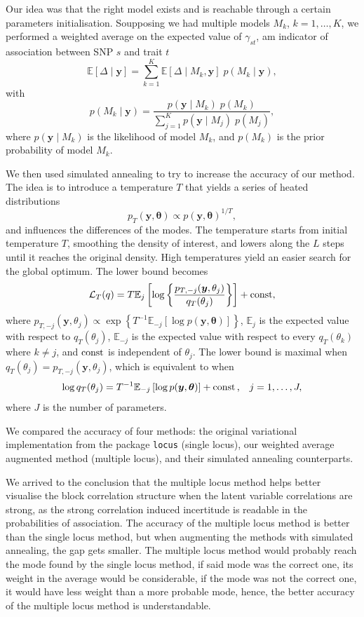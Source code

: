 \documentclass[a4paper, 11pt]{report}
\numberwithin{equation}{chapter}
\DeclareMathOperator*{\const}{{\rm const}}
\begin{document}
Our idea was that the right model exists and is reachable through a certain parameters initialisation. Soupposing we had multiple models $M_k$, $k=1, \dots, K$, we performed a weighted average on the expected value of $\gamma_{st}$, am indicator of association between SNP $s$ and trait $t$
$$
\mathbb{E}\left[\Delta \mid \boldsymbol{y}\right] = \sum_{k=1}^K\mathbb{E}\left[\Delta \mid M_k, \boldsymbol{y}\right]\;p(M_k \mid \boldsymbol{y}),
$$
with 
$$
p(M_k \mid \boldsymbol{y}) = \frac{p(\boldsymbol{y} \mid M_k)\; p(M_k)}{\sum_{j=1}^K p(\boldsymbol{y} \mid M_j)\; p(M_j)},
$$
where $p(\boldsymbol{y}\mid M_k)$ is the likelihood of model $M_k$, and $p(M_k)$ is the prior probability of model $M_k$.

We then used simulated annealing to try to increase the accuracy of our method. The idea is to introduce a temperature $T$ that yields a series of heated distributions
$$
p_T(\boldsymbol{y},\boldsymbol{\theta}) \propto p(\boldsymbol{y},\boldsymbol{\theta})^{1/T},
$$
and influences the differences of the modes. The temperature starts from initial temperature $T$, smoothing the density of interest, and lowers along the $L$ steps until it reaches the original density. High temperatures yield an easier search for the global optimum. The lower bound becomes
$$
\mathcal{L}_T(q) = T\mathbb{E}_j\left[\log\left\lbrace\frac{p_{T, -j}(\boldsymbol{y}, \theta_j)}{q_T(\theta_j)}\right\rbrace\right] + \const,	
$$
where $p_{T, -j}(\boldsymbol{y},\theta_j) \propto \exp\left\lbrace T^{-1}\mathbb{E}_{-j}\left[\log p(\boldsymbol{y},\boldsymbol{\theta})\right]\right\rbrace$, $\mathbb{E}_j$ is the expected value with respect to $q_T(\theta_j)$, $\mathbb{E}_{-j}$ is the expected value with respect to every $ q_T(\theta_k)$ where $k \neq j$, and $\const$ is independent of $\theta_j$. The lower bound is maximal when $q_T(\theta_j) = p_{T,-j}(\boldsymbol{y},\theta_j)$, which is equivalent to when
$$
\log q_T(\theta_j) = T^{-1} \mathbb{E}_{-j}\left[\log p(\boldsymbol{y}, \boldsymbol{\theta})\right] + \const\text{,}\quad j=1,\dots,J,
$$
where $J$ is the number of parameters.

We compared the accuracy of four methods: the original variational implementation from the package \texttt{locus} (single locus), our weighted average augmented method (multiple locus), and their simulated annealing counterparts. 

We arrived to the conclusion that the multiple locus method helps better visualise the block correlation structure when the latent variable correlations are strong, as the strong correlation induced incertitude is readable in the probabilities of association. The accuracy of the multiple locus method is better than the single locus method, but when augmenting the methods with simulated annealing, the gap gets smaller. The multiple locus method would probably reach the mode found by the single locus method, if said mode was the correct one, its weight in the average would be considerable, if the mode was not the correct one, it would have less weight than a more probable mode, hence, the better accuracy of the multiple locus method is understandable.
\end{document}
